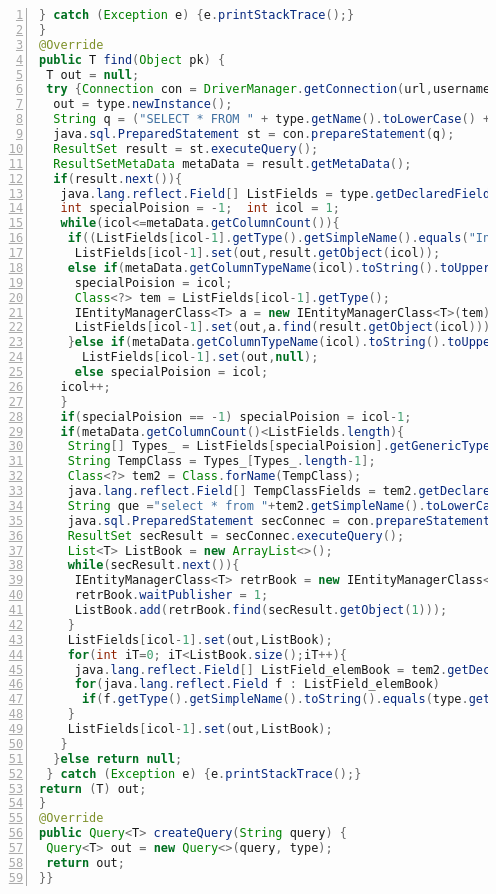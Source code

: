 \documentclass[10pt]{report}
\begin{document}
\begin{lstlisting}[numbers=left,language=Java,frame=single,breaklines=true,label=Code:ZeroIn, caption=IEntityManger Class.]
} catch (Exception e) {e.printStackTrace();}
}
@Override
public T find(Object pk) {
 T out = null;
 try {Connection con = DriverManager.getConnection(url,username,password);
  out = type.newInstance();
  String q = ("SELECT * FROM " + type.getName().toLowerCase() + " WHERE id = " + pk + ";");
  java.sql.PreparedStatement st = con.prepareStatement(q);
  ResultSet result = st.executeQuery();
  ResultSetMetaData metaData = result.getMetaData();
  if(result.next()){
   java.lang.reflect.Field[] ListFields = type.getDeclaredFields();
   int specialPoision = -1;  int icol = 1;
   while(icol<=metaData.getColumnCount()){
    if((ListFields[icol-1].getType().getSimpleName().equals("Integer") && metaData.getColumnTypeName(icol).equals("INT")) || (ListFields[icol-1].getType().getSimpleName().equals("String") && metaData.getColumnTypeName(icol).equals("VARCHAR")))
     ListFields[icol-1].set(out,result.getObject(icol));
    else if(metaData.getColumnTypeName(icol).toString().toUpperCase().equals("INT") && waitPublisher == 0){
     specialPoision = icol;
     Class<?> tem = ListFields[icol-1].getType();
     IEntityManagerClass<T> a = new IEntityManagerClass<T>(tem);
     ListFields[icol-1].set(out,a.find(result.getObject(icol)));
    }else if(metaData.getColumnTypeName(icol).toString().toUpperCase().equals("INT") && waitPublisher == 1)
      ListFields[icol-1].set(out,null);
     else specialPoision = icol;
   icol++;
   }
   if(specialPoision == -1)	specialPoision = icol-1;
   if(metaData.getColumnCount()<ListFields.length){		
    String[] Types_ = ListFields[specialPoision].getGenericType().toString().split("\\W");
    String TempClass = Types_[Types_.length-1];
    Class<?> tem2 = Class.forName(TempClass);			
    java.lang.reflect.Field[] TempClassFields = tem2.getDeclaredFields();
    String que ="select * from "+tem2.getSimpleName().toLowerCase()+" where "+tem2.getSimpleName().toLowerCase()+"."+TempClassFields[specialPoision].getName()+" = "+pk+";";
    java.sql.PreparedStatement secConnec = con.prepareStatement(que);
    ResultSet secResult = secConnec.executeQuery();
    List<T> ListBook = new ArrayList<>();
    while(secResult.next()){
     IEntityManagerClass<T> retrBook = new IEntityManagerClass<T>(tem2);
     retrBook.waitPublisher = 1;
     ListBook.add(retrBook.find(secResult.getObject(1)));
    }
    ListFields[icol-1].set(out,ListBook);
    for(int iT=0; iT<ListBook.size();iT++){
     java.lang.reflect.Field[] ListField_elemBook = tem2.getDeclaredFields();
     for(java.lang.reflect.Field f : ListField_elemBook)
      if(f.getType().getSimpleName().toString().equals(type.getName())) f.set(ListBook.get(iT),out);
    }
    ListFields[icol-1].set(out,ListBook);
   }
  }else return null;
 } catch (Exception e) {e.printStackTrace();}
return (T) out;
}
@Override
public Query<T> createQuery(String query) {
 Query<T> out = new Query<>(query, type);
 return out;
}}
\end{lstlisting}
\end{document}

